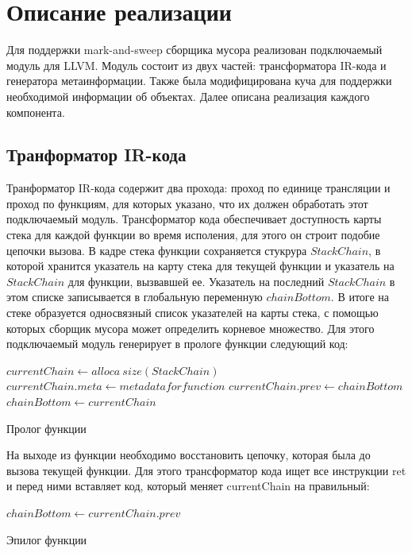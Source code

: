 \section{Описание реализации}
Для поддержки mark-and-sweep сборщика мусора реализован подключаемый модуль для LLVM. Модуль состоит из двух частей: трансформатора IR-кода и генератора метаинформации. Также была модифицирована куча для поддержки необходимой информации об объектах. Далее описана реализация каждого компонента.
\subsection{Транформатор IR-кода}
Транформатор IR-кода содержит два прохода: проход по единице трансляции и проход по функциям, для которых указано, что их должен обработать этот подключаемый модуль. Трансформатор кода обеспечивает доступность карты стека для каждой функции во время исполения, для этого он строит подобие цепочки вызова. В кадре стека функции сохраняется стукрура $StackChain$, в которой хранится указатель на карту стека для текущей функции и указатель на $StackChain$ для функции, вызвавшей ее. Указатель на последний $StackChain$ в этом списке записывается в глобальную переменную $chainBottom$. В итоге на стеке образуется односвязный список указателей на карты стека, с помощью которых сборщик мусора может определить корневое множество.
Для этого подключаемый модуль генерирует в прологе функции следующий код:

\begin{algorithm}
\begin{algorithmic}[1]
\State $currentChain \gets alloca~size(StackChain)$
\State $currentChain.meta \gets metadata for function$
\State $currentChain.prev \gets chainBottom$
\State $chainBottom \gets currentChain$
\end{algorithmic}
\caption{Пролог функции}
\end{algorithm}

На выходе из функции необходимо восстановить цепочку, которая была до вызова текущей функции. Для этого трансформатор кода ищет все инструкции ret и перед ними вставляет код, который меняет currentChain на правильный:

\begin{algorithm}
\begin{algorithmic}[1]
\State $chainBottom \gets currentChain.prev$
\end{algorithmic}
\caption{Эпилог функции}
\end{algorithm}

